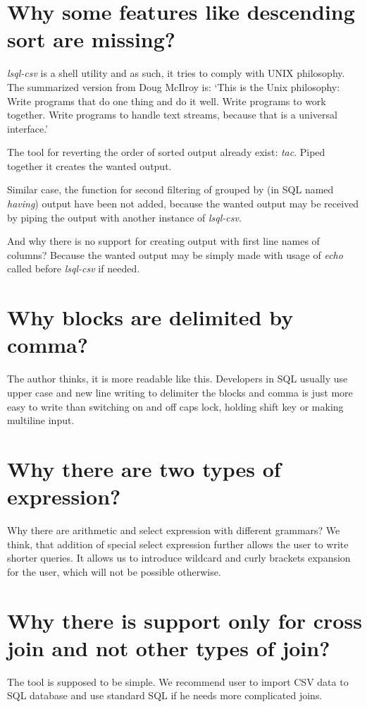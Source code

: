 \section{Why some features like descending sort are missing?}
\textit{lsql-csv} is a shell utility and as such, it tries to comply with UNIX philosophy. 
The summarized version from Doug McIlroy is: `This is the Unix philosophy: Write programs that do one thing and do it well. Write programs to work together. Write programs to handle text streams, because that is a universal interface.' \cite{unix-philosophy}

The tool for reverting the order of sorted output already exist: \textit{tac}. Piped together it creates the wanted output.

Similar case, the function for second filtering of grouped by (in SQL named \textit{having}) 
output have been not added, because the wanted output
may be received by piping the output with another instance of \textit{lsql-csv}.

And why there is no support for creating output with first line names of columns? Because the wanted output
may be simply made with usage of \textit{echo} called before \textit{lsql-csv} if needed.

\section{Why blocks are delimited by comma?}
The author thinks, it is more readable like this. Developers in SQL usually use upper case and new line writing to delimiter the blocks and comma is just more easy to write than switching on and off caps lock, holding shift key or making multiline input.

\section{Why there are two types of expression?}
Why there are arithmetic and select expression with different grammars?
We think, that addition of special select expression further allows the user to write shorter queries.
It allows us to introduce wildcard and curly brackets expansion for the user, which will not be possible otherwise.

\section{Why there is support only for cross join and not other types of join?}
The tool is supposed to be simple. We recommend user to import CSV data to SQL database and use standard SQL if he needs more complicated joins.

